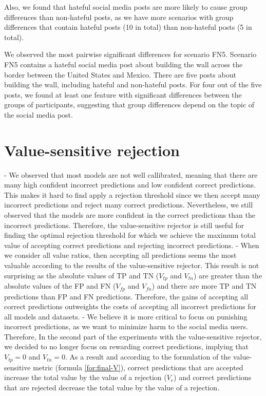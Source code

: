 %
Also, we found that hateful social media posts are more likely to cause group differences than non-hateful posts, as we have more scenarios with group differences that contain hateful posts (10 in total) than non-hateful posts (5 in total).
%

%
We observed the most pairwise significant differences for scenario FN5.
%
Scenario FN5 contains a hateful social media post about building the wall across the border between the United States and Mexico.
%
There are five posts about building the wall, including hateful and non-hateful posts.
%
For four out of the five posts, we found at least one feature with significant differences between the groups of participants, suggesting that group differences depend on the topic of the social media post.
%


\section{Value-sensitive rejection}
\label{sec:discussion-rejection}
- We observed that most models are not well callibrated, meaning that there are many high confident incorrect predictions and low confident correct predictions. This makes it hard to find apply a rejection threshold since we then accept many incorrect predictions and reject many correct predictions. Nevertheless, we still observed that the models are more confident in the correct predictions than the incorrect predictions. Therefore, the value-sensitive rejector is still useful for finding the optimal rejection threshold for which we achieve the maximum total value of accepting correct predictions and rejecting incorrect predictions.
- When we consider all value ratios, then accepting all predictions seems the most valuable according to the results of the value-sensitive rejector. This result is not surprising as the absolute values of TP and TN ($V_{tp}$ and $V_{tn}$) are greater than the absolute values of the FP and FN ($V_{fp}$ and $V_{fn}$) and there are more TP and TN predictions than FP and FN predictions. Therefore, the gains of accepting all correct predictions outweights the costs of accepting all incorrect predictions for all models and datasets.
- We believe it is more critical to focus on punishing incorrect predictions, as we want to minimize harm to the social media users. Therefore, In the second part of the experiments with the value-sensitive rejector, we decided to no longer focus on rewarding correct predictions, implying that $V_{tp}=0$ and $V_{tn}=0$. As a result and according to the formulation of the value-sensitive metric (formula \ref{for:final-V}), correct predictions that are accepted increase the total value by the value of a rejection ($V_r$) and correct predictions that are rejected decrease the total value by the value of a rejection.


